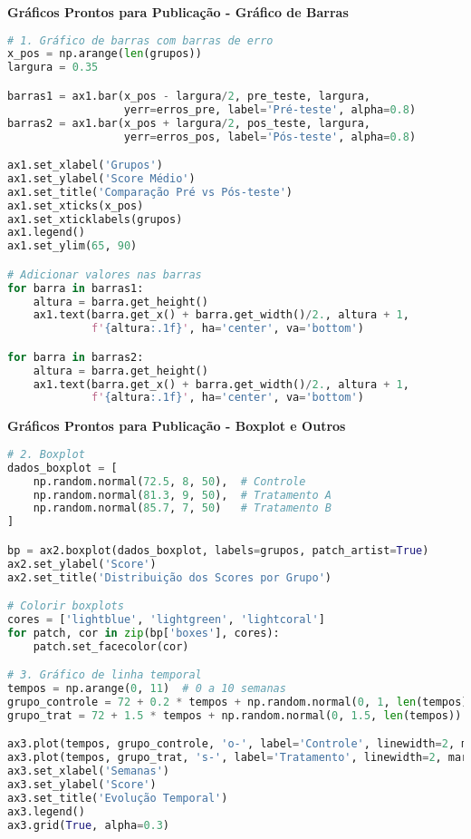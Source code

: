 \begin{examplebox}
\textbf{Gráficos Prontos para Publicação - Gráfico de Barras}

\begin{lstlisting}[language=Python]
# 1. Gráfico de barras com barras de erro
x_pos = np.arange(len(grupos))
largura = 0.35

barras1 = ax1.bar(x_pos - largura/2, pre_teste, largura, 
                  yerr=erros_pre, label='Pré-teste', alpha=0.8)
barras2 = ax1.bar(x_pos + largura/2, pos_teste, largura,
                  yerr=erros_pos, label='Pós-teste', alpha=0.8)

ax1.set_xlabel('Grupos')
ax1.set_ylabel('Score Médio')
ax1.set_title('Comparação Pré vs Pós-teste')
ax1.set_xticks(x_pos)
ax1.set_xticklabels(grupos)
ax1.legend()
ax1.set_ylim(65, 90)

# Adicionar valores nas barras
for barra in barras1:
    altura = barra.get_height()
    ax1.text(barra.get_x() + barra.get_width()/2., altura + 1,
             f'{altura:.1f}', ha='center', va='bottom')

for barra in barras2:
    altura = barra.get_height()
    ax1.text(barra.get_x() + barra.get_width()/2., altura + 1,
             f'{altura:.1f}', ha='center', va='bottom')
\end{lstlisting}
\end{examplebox}

\begin{examplebox}
\textbf{Gráficos Prontos para Publicação - Boxplot e Outros}

\begin{lstlisting}[language=Python]
# 2. Boxplot
dados_boxplot = [
    np.random.normal(72.5, 8, 50),  # Controle
    np.random.normal(81.3, 9, 50),  # Tratamento A
    np.random.normal(85.7, 7, 50)   # Tratamento B
]

bp = ax2.boxplot(dados_boxplot, labels=grupos, patch_artist=True)
ax2.set_ylabel('Score')
ax2.set_title('Distribuição dos Scores por Grupo')

# Colorir boxplots
cores = ['lightblue', 'lightgreen', 'lightcoral']
for patch, cor in zip(bp['boxes'], cores):
    patch.set_facecolor(cor)

# 3. Gráfico de linha temporal
tempos = np.arange(0, 11)  # 0 a 10 semanas
grupo_controle = 72 + 0.2 * tempos + np.random.normal(0, 1, len(tempos))
grupo_trat = 72 + 1.5 * tempos + np.random.normal(0, 1.5, len(tempos))

ax3.plot(tempos, grupo_controle, 'o-', label='Controle', linewidth=2, markersize=6)
ax3.plot(tempos, grupo_trat, 's-', label='Tratamento', linewidth=2, markersize=6)
ax3.set_xlabel('Semanas')
ax3.set_ylabel('Score')
ax3.set_title('Evolução Temporal')
ax3.legend()
ax3.grid(True, alpha=0.3)
\end{lstlisting}
\end{examplebox}

